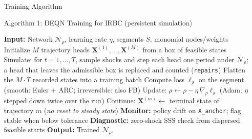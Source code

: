 \documentclass[aspectratio=169,11pt]{beamer}
\begin{document}
\begin{frame}{Training Algorithm}
\begin{block}{Algorithm 1: DEQN Training for IRBC (persistent simulation)}
\begin{algorithmic}
\footnotesize
\STATE \textbf{Input:} Network $\mathcal{N}_\rho$, learning rate $\eta$, segments $S$, monomial nodes/weights
\STATE Initialize $M$ trajectory heads $\bm{X}^{(1)}, \ldots, \bm{X}^{(M)}$ from a box of feasible states
    \STATE Simulate: for $t = 1, \ldots, T$, sample shocks and step each head one period under $\mathcal{N}_\rho$; a head that leaves the admissible box is replaced and counted (\texttt{repairs})
    \STATE Flatten the $M\!\cdot\!T$ recorded states into a training batch
        \STATE Compute loss $\ell_\rho$ on the segment (smooth: Euler + ARC; irreversible: also FB)
        \STATE Update: $\rho \leftarrow \rho - \eta\,\nabla_\rho \ell_\rho$ (Adam; $\eta$ stepped down twice over the run)
    \ENDFOR
    \STATE Continue: $\bm{X}^{(m)} \leftarrow$ terminal state of trajectory $m$ (\emph{no reset to steady state})
    \STATE \textbf{Monitor:} policy drift on \texttt{X\_anchor}; flag stable when below tolerance
\ENDFOR
\STATE \textbf{Diagnostic:} zero-shock SSS check from dispersed feasible starts
\STATE \textbf{Output:} Trained $\mathcal{N}_{\rho^\star}$
\end{algorithmic}
\end{block}
\end{frame}
\end{document}
